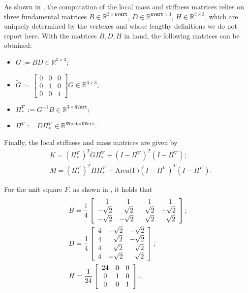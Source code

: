 \documentclass[a4paper]{article}
\begin{document}
\noindent
As shown in \cite{hitchhikers}, the computation of the local mass and stiffness matrices relies on three fundamental matrices $B \in \mathbb{R}^{3\times\texttt{NVert}}$,  $D \in \mathbb{R}^{\texttt{NVert} \times 3}$, $H \in\mathbb{R}^{3\times 3}$, which are uniquely determined by the vertexes and whose lengthy definitions we do not report here. With the matrices $B,D,H$ in hand, the following matrices can be obtained:
\begin{itemize}
\item $G := BD \in\mathbb{R}^{3\times 3}$;
\item $\widetilde{G} := \left[\begin{array}{ccc}
0 & 0 & 0\\ 0 & 1 & 0 \\ 0 & 0 & 1
\end{array}\right] G \in\mathbb{R}^{3\times 3}$;
\item $\Pi^\nabla_* := G^{-1}B \in \mathbb{R}^{3\times\texttt{NVert}}$;
\item $\Pi^\nabla := D\Pi^\nabla_* \in \mathbb{R}^{\texttt{NVert}\times\texttt{NVert}}$.
\end{itemize}

\noindent
Finally, the local stiffness and mass matrices are given by
\begin{align}
&K = (\Pi^\nabla_*)^T \widetilde{G} \Pi^\nabla_* + (I-\Pi^\nabla)^T(I-\Pi^\nabla);\\
&M = (\Pi^\nabla_*)^T H \Pi^\nabla_* + \text{Area(F)}(I-\Pi^\nabla)^T(I-\Pi^\nabla).
\end{align}

\noindent
For the unit square $F$,  as shown in \cite{hitchhikers}, it holds that
\begin{align}
&B = \frac{1}{4}\left[\begin{array}{c c c c}
\ \ 1 & \ \ 1 & \ \ 1 & \ \ 1\\
-\sqrt{2} & \ \ \sqrt{2} & \ \ \sqrt{2} & -\sqrt{2}\\
-\sqrt{2} & -\sqrt{2} & \ \ \sqrt{2} & \ \ \sqrt{2}
\end{array}\right];\\
%
&D = \frac{1}{4}\left[\begin{array}{c c c}
4 & -\sqrt{2} & -\sqrt{2}\\
4 & \ \ \sqrt{2} & -\sqrt{2}\\
4 & \ \ \sqrt{2} & \ \ \sqrt{2}\\
4 & -\sqrt{2} & \ \ \sqrt{2}\\
\end{array}\right];\\
%
&H = \frac{1}{24}\left[\begin{array}{c c c}
24 & 0 & 0\\
0 & 1 & 0\\
0 & 0 & 1\\
\end{array}\right].
\end{align}
\end{document}
